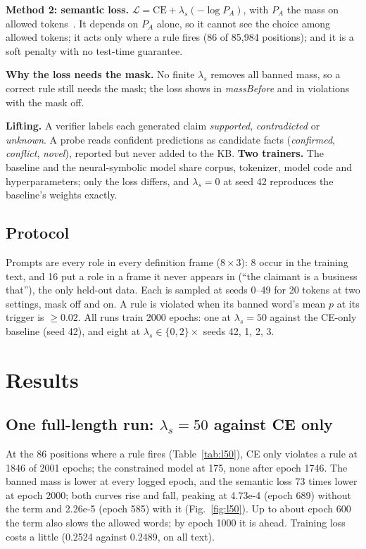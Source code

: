 \documentclass[letterpaper, 10pt, conference]{IEEEtran}
\begin{document}
\textbf{Method 2: semantic loss.} $\mathcal{L}=\mathrm{CE}+\lambda_s(-\log P_A)$, with $P_A$ the mass on allowed tokens~\cite{xu2018,ahmed2023}. It depends on $P_A$ alone, so it cannot see the choice among allowed tokens; it acts only where a rule fires (86 of 85,984 positions); and it is a soft penalty with no test-time guarantee.

\textbf{Why the loss needs the mask.} No finite $\lambda_s$ removes all banned mass, so a correct rule still needs the mask; the loss shows in \textit{massBefore} and in violations with the mask off.

\textbf{Lifting.} A verifier labels each generated claim \emph{supported}, \emph{contradicted} or \emph{unknown}. A probe reads confident predictions as candidate facts (\emph{confirmed}, \emph{conflict}, \emph{novel}), reported but never added to the KB. \textbf{Two trainers.} The baseline and the neural-symbolic model share corpus, tokenizer, model code and hyperparameters; only the loss differs, and $\lambda_s{=}0$ at seed 42 reproduces the baseline's weights exactly.

\subsection{Protocol}
Prompts are every role in every definition frame ($8\times3$): 8 occur in the training text, and 16 put a role in a frame it never appears in (``the claimant is a business that''), the only held-out data. Each is sampled at seeds 0--49 for 20 tokens at two settings, mask off and on. A rule is violated when its banned word's mean $p$ at its trigger is ${\ge}0.02$. All runs train 2000 epochs: one at $\lambda_s{=}50$ against the CE-only baseline (seed 42), and eight at $\lambda_s\in\{0,2\}\times$ seeds 42, 1, 2, 3.

\section{Results}
\subsection{One full-length run: $\lambda_s{=}50$ against CE only}
At the 86 positions where a rule fires (Table~\ref{tab:l50}), CE only violates a rule at 1846 of 2001 epochs; the constrained model at 175, none after epoch 1746. The banned mass is lower at every logged epoch, and the semantic loss 73 times lower at epoch 2000; both curves rise and fall, peaking at 4.73e-4 (epoch 689) without the term and 2.26e-5 (epoch 585) with it (Fig.~\ref{fig:l50}). Up to about epoch 600 the term also slows the allowed words; by epoch 1000 it is ahead. Training loss costs a little (0.2524 against 0.2489, on all text).
\end{document}
